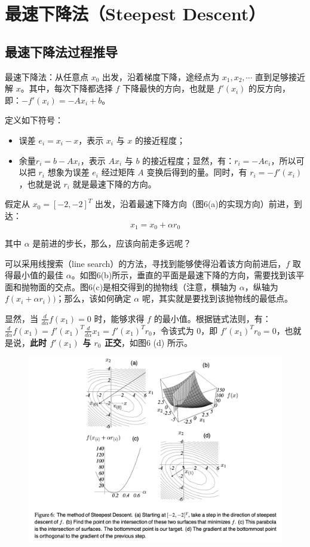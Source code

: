 \documentclass[12pt]{article}
\begin{document}
\section{最速下降法（Steepest Descent）}
\subsection{最速下降法过程推导}
最速下降法：从任意点 $x_0$ 出发，沿着梯度下降，途经点为 $x_1, x_2, \cdots $ 直到足够接近解 $x$。其中，每次下降都选择 $f$ 下降最快的方向，也就是 $f'(x_i)$ 的反方向，即：$-f'(x_i) = -Ax_i + b$。

定义如下符号：
\begin{itemize}
\setlength{\itemsep}{0pt}
\setlength{\parsep}{0pt}
\setlength{\parskip}{0pt}
    \item 误差 $e_i = x_i - x$，表示 $x_i$ 与 $x$ 的接近程度；
    \item 余量$r_i = b - Ax_i$，表示 $Ax_i$ 与 $b$ 的接近程度；显然，有：$r_i = -Ae_i$，所以可以把 $r_i$ 想象为误差 $e_i$ 经过矩阵 $A$ 变换后得到的量。同时，有 $r_i = -f'(x_i)$，也就是说 $r_i$ 就是最速下降的方向。
\end{itemize}

假定从 $x_0 = [-2, -2]^T$ 出发，沿着最速下降方向（图6(a)的实现方向）前进，到达：
$$
x_1 = x_0 + \alpha r_0
$$

其中 $\alpha$ 是前进的步长，那么，应该向前走多远呢？

可以采用线搜索（line search）的方法，寻找到能够使得沿着该方向前进后，$f$ 取得最小值的最佳 $\alpha$。如图6(b)所示，垂直的平面是最速下降的方向，需要找到该平面和抛物面的交点。图6(c)是相交得到的抛物线（注意，横轴为 $\alpha$，纵轴为 $f(x_i + \alpha r_i))$；那么，该如何确定 $\alpha$ 呢，其实就是要找到该抛物线的最低点。

显然，当 $\frac{d}{d\alpha}f(x_1) = 0$ 时，能够求得 $f$ 的最小值。根据链式法则，有：$\frac{d}{d\alpha}f(x_1) = f'(x_1)^T\frac{d}{d\alpha}x_1 = f'(x_1)^Tr_0$，令该式为 0，即 $f'(x_1)^Tr_0 = 0$，也就是说，\textbf{此时 $f'(x_1)$ 与 $r_0$ 正交}，如图6 (d) 所示。
\begin{figure}[H]
    \centering
    \includegraphics[width=1\textwidth]{fig/CG_Plot_SD_1.png}
\end{figure}
\end{document}
